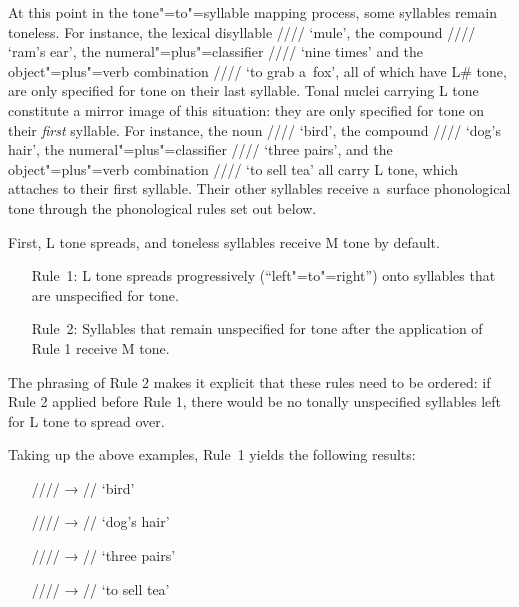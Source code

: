 At this point in the tone"=to"=syllable mapping process, some syllables remain toneless. For instance,
the lexical disyllable //// ‘mule’, the compound //// ‘ram’s ear’, the
numeral"=plus"=classifier //// ‘nine times’ and the object"=plus"=verb combination
//// ‘to grab a~fox’, all of which have L\# tone, are only specified for tone on their
last syllable. Tonal nuclei carrying L tone constitute a mirror image of this situation: they are only specified for tone on their \textit{first} syllable. For instance, the noun //// ‘bird’, the compound //// ‘dog’s hair’, the numeral"=plus"=classifier
//// ‘three pairs’, and the object"=plus"=verb combination //// ‘to sell
tea’ all carry L tone, which attaches to their first syllable. Their other syllables receive a~surface phonological tone through the phonological rules set out below.

First, L tone spreads, and toneless syllables receive M tone by default.

\begin{enumerate}[leftmargin=2cm, itemsep=0pt, labelwidth=\widthof{Rule~1:}]%
\item[Rule~1:] L tone spreads progressively (“left"=to"=right”) onto syllables that are unspecified for tone.
\item[Rule~2:] Syllables that remain unspecified for tone after the application of Rule 1 receive M tone.
\end{enumerate}

The {phrasing} of Rule 2 makes it explicit that these rules need to be ordered: if Rule 2 applied
before Rule 1, there would be no tonally unspecified syllables left for L tone to spread over.

Taking up the above examples, Rule~1 yields the following results:

\begin{enumerate}[itemsep=-1mm]
	\item[] //// → // ‘bird’ 
	\item[] //// → // ‘dog’s hair’
	\item[] //// → // ‘three
	pairs’ 
	\item[] //// → // ‘to sell tea’
\end{enumerate}

